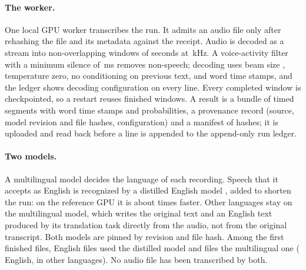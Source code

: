 \documentclass[letterpaper]{article} %
\begin{document}
\paragraph{The worker.} One local GPU worker transcribes the run. It admits an audio file only after rehashing the file and its metadata against the receipt. Audio is decoded as a stream into non-overlapping windows of \WindowSeconds{} seconds at \SampleRateKhz{}\,kHz. A voice-activity filter with a minimum silence of \VadMinSilenceMs{}\,ms removes non-speech; decoding uses beam size \BeamSize, temperature zero, no conditioning on previous text, and word time stamps, and the ledger shows \NDecodingConfigs{} decoding configuration on every line. Every completed window is checkpointed, so a restart reuses finished windows. A result is a bundle of timed segments with word time stamps and probabilities, a provenance record (source, model revision and file hashes, configuration) and a manifest of hashes; it is uploaded and read back before a line is appended to the append-only run ledger.

\paragraph{Two models.} A multilingual model \cite{radford2022robust} decides the language of each recording. Speech that it accepts as English is recognized by a distilled English model \cite{gandhi2023distilwhisper}, added to shorten the run: on the reference GPU it is about \DistilSpeedup{} times faster. Other languages stay on the multilingual model, which writes the original text and an English text produced by its translation task directly from the audio, not from the original transcript. Both models are pinned by revision and file hash. Among the first \ModelCountBase{} finished files, \NModelDistilEnglish{} English files used the distilled model and \NModelFull{} files the multilingual one (\NModelFullEnglish{} English, \NModelFullNonEnglish{} in other languages). No audio file has been transcribed by both.
\end{document}
